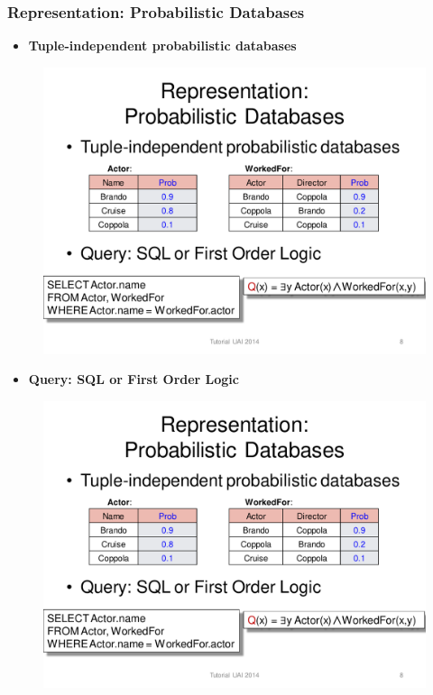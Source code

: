 \documentclass{beamer}
\newcommand{\bi}{\begin{itemize}}
\newcommand{\ei}{\end{itemize}}
\newcommand{\ii}{\item}
\begin{document}
\begin{frame}
\frametitle{Representation: Probabilistic Databases}
\bi
\ii \textbf{Tuple-independent probabilistic databases}
\ei

\begin{figure}[h]
\centering\includegraphics[width=0.91\linewidth]{actor-table.pdf}
\end{figure}

\bi
\ii \textbf{Query: SQL or First Order Logic}
\ei

\begin{figure}[h]
\centering\includegraphics[width=0.91\linewidth]{actor-sql.pdf}
\end{figure}

\end{frame}
\end{document}
